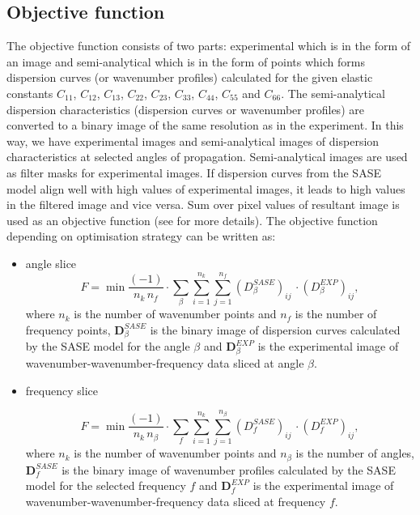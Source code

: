 \documentclass[preprint,12pt]{elsarticle}
\newcommand{\matr}[1]{\mathbf{#1}} %
\begin{document}
\subsection{Objective function}
The objective function consists of two parts: experimental which is in the form of an image and semi-analytical which is in the form of points which forms dispersion curves (or wavenumber profiles) calculated for the given elastic constants $C_{11}$, $C_{12}$, $C_{13}$, $C_{22}$, $C_{23}$, $C_{33}$, $C_{44}$, $C_{55}$ and $C_{66}$.
The semi-analytical dispersion characteristics (dispersion curves or wavenumber profiles) are converted to a binary image of the same resolution as in the experiment. 
In this way, we have experimental images and semi-analytical images of dispersion characteristics at selected angles of propagation. 
Semi-analytical images are used as filter masks for experimental images.
If dispersion curves from the SASE model align well with high values of experimental images, it leads to high values in the filtered image and vice versa.
Sum over pixel values of resultant image is used as an objective function (see \cite{Kudela2020} for more details).
The objective function depending on optimisation strategy can be written as:
\begin{itemize}
	\item angle slice
\begin{equation}
	F=\min \frac{(-1)}{n_k \, n_f} \cdot \sum_{\beta} \sum_{i=1}^{n_k} \sum_{j=1}^{n_f} (D_{\beta}^{SASE})_{ij} \, \cdot (D_{\beta}^{EXP})_{ij},
	\label{eq:obj_fun_beta}
\end{equation}
where \(n_k\) is the number of wavenumber points and \(n_f\) is the number of frequency points, $\matr{D}_{\beta}^{SASE}$ is the binary image of dispersion curves calculated by the SASE model for the angle $\beta$ and $\matr{D}_{\beta}^{EXP}$ is the experimental image of wavenumber-wavenumber-frequency data sliced at angle $\beta$.

\item frequency slice

\begin{equation}
	F=\min \frac{(-1)}{n_k \, n_{\beta}} \cdot \sum_{f} \sum_{i=1}^{n_k} \sum_{j=1}^{n_{\beta}} (D_{f}^{SASE})_{ij} \, \cdot (D_{f}^{EXP})_{ij},
	\label{eq:obj_fun_freq}
\end{equation}
where \(n_k\) is the number of wavenumber points and \(n_{\beta}\) is the number of angles, $\matr{D}_{f}^{SASE}$ is the binary image of wavenumber profiles calculated by the SASE model for the selected frequency $f$ and $\matr{D}_{f}^{EXP}$ is the experimental image of wavenumber-wavenumber-frequency data sliced at frequency $f$.
\end{itemize}
\end{document}
